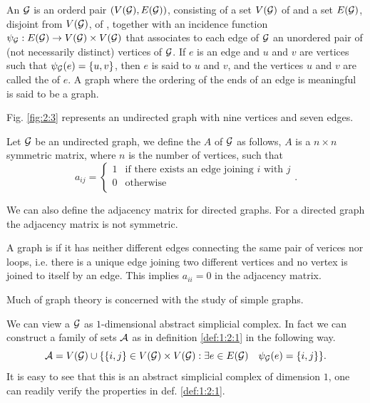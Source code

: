\documentclass[../2.tex]{subfiles}
\begin{document}
    \begin{defn}
        An  $\mathcal{G}$ is an orderd pair $(V(\mathcal{G}),E(\mathcal{G}))$, consisting of a set $V(\mathcal{G})$ of 
        and a set $E(\mathcal{G})$, disjoint from $V(\mathcal{G})$, of , together with an incidence function
        $\psi_{\mathcal{G}}:E(\mathcal{G}) \to V(\mathcal{G}) \times V(\mathcal{G})$ that associates to each edge of $\mathcal{G}$ an unordered pair of (not necessarily
        distinct) vertices of $\mathcal{G}$. If $e$ is an edge and $u$ and $v$ are vertices such that $\psi_{\mathcal{G}}(e) =
        \{u, v\}$, then $e$ is said to  $u$ and $v$, and the vertices $u$ and $v$ are called the 
        of $e$. A graph where the ordering of the ends of an edge is meaningful is said to be a  graph.
    \end{defn}

    Fig. \ref{fig:2:3} represents an undirected graph with nine vertices and seven edges.

    \begin{defn}
        Let $\mathcal{G}$ be an undirected graph, we define the  $A$ of $\mathcal{G}$ as follows,
        $A$ is a $n \times n$ symmetric matrix, where $n$ is the number of vertices, such that
        \[a_{ij} = 
        \begin{cases}
            1 & \text{if there exists an edge joining $i$ with $j$} \\
            0 & \text{otherwise} \\
        \end{cases}. \]        
    \end{defn}

    \begin{rem}
        We can also define the adjacency matrix for directed graphs.
        For a directed graph the adjacency matrix is not symmetric.
    \end{rem}

    \begin{defn}
        A graph is  if it has neither different edges connecting the same pair of verices nor loops, i.e. there is a unique edge joining two different vertices
        and no vertex is joined to itself by an edge. This implies $a_{ii} = 0$ in the adjacency matrix.
    \end{defn}
    
    Much of graph theory is concerned with the study of simple graphs.

    \begin{obs}
        We can view a  $\mathcal{G}$ as $1$-dimensional abstract simplicial complex.
        In fact we can construct a family of sets $\mathcal{A}$ as in definition \ref{def:1:2:1} in the following way.
        \[ \mathcal{A} = V(\mathcal{G}) \cup \{ \{i,j\} \in V(\mathcal{G}) \times V(\mathcal{G}) : \exists e \in E(\mathcal{G}) \quad \psi_{\mathcal{G}}(e)=\{i,j\}\}. \]
        It is easy to see that this is an abstract simplicial complex of dimension $1$, one can readily verify the properties in def. \ref{def:1:2:1}.
    \end{obs}
\end{document}

